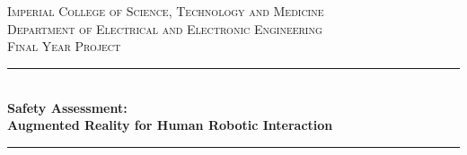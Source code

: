 \documentclass[12pt,a4paper]{report}
\begin{document}
\begin{titlepage}


\newcommand{\HRule}{\rule{\linewidth}{0.5mm}} %
\setlength{\topmargin}{0in}
\center %
 
\vspace*{-3cm}
 
\begin{minipage}{0.4\textwidth}
\begin{flushleft} \large
\hspace*{-0.5cm}
\end{flushleft}
\end{minipage}
~
\begin{minipage}{0.5\textwidth}
\begin{flushright} \large
\hspace*{2cm}
\end{flushright}
\end{minipage}\\[1cm]

\textsc{\LARGE Imperial College of Science, Technology and Medicine}\\[1.5cm] %
\textsc{\Large Department of Electrical and Electronic Engineering}\\[0.8cm] %
\textsc{\Large  Final Year Project}\\[0.8cm] %


\addvspace{1.8em}

\HRule \\[0.2cm]
{ \huge \bfseries Safety Assessment:\\ Augmented Reality for Human Robotic Interaction }\\[0.2cm] %
\HRule \\[1cm]
 

\end{titlepage}
\end{document}

